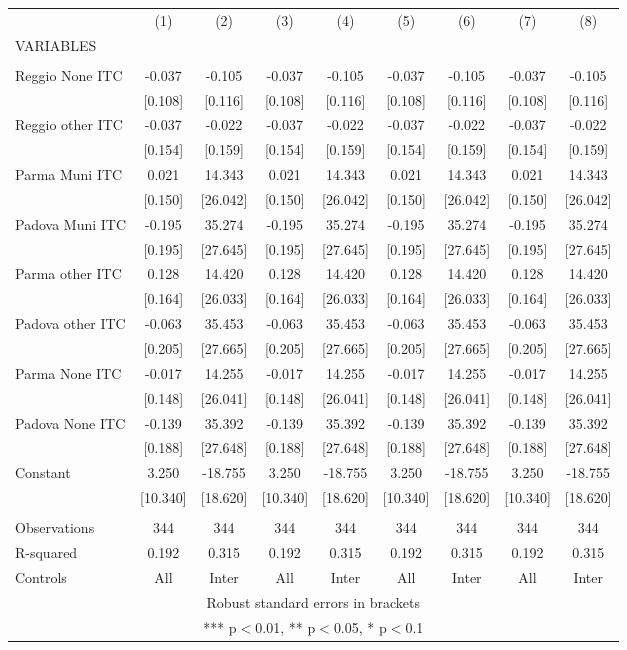 \begin{tabular}{lcccccccc} \hline
 & (1) & (2) & (3) & (4) & (5) & (6) & (7) & (8) \\
VARIABLES &  &  &  &  &  &  &  &  \\ \hline
 &  &  &  &  &  &  &  &  \\
Reggio None ITC & -0.037 & -0.105 & -0.037 & -0.105 & -0.037 & -0.105 & -0.037 & -0.105 \\
 & [0.108] & [0.116] & [0.108] & [0.116] & [0.108] & [0.116] & [0.108] & [0.116] \\
Reggio other ITC & -0.037 & -0.022 & -0.037 & -0.022 & -0.037 & -0.022 & -0.037 & -0.022 \\
 & [0.154] & [0.159] & [0.154] & [0.159] & [0.154] & [0.159] & [0.154] & [0.159] \\
Parma Muni ITC & 0.021 & 14.343 & 0.021 & 14.343 & 0.021 & 14.343 & 0.021 & 14.343 \\
 & [0.150] & [26.042] & [0.150] & [26.042] & [0.150] & [26.042] & [0.150] & [26.042] \\
Padova Muni ITC & -0.195 & 35.274 & -0.195 & 35.274 & -0.195 & 35.274 & -0.195 & 35.274 \\
 & [0.195] & [27.645] & [0.195] & [27.645] & [0.195] & [27.645] & [0.195] & [27.645] \\
Parma other ITC & 0.128 & 14.420 & 0.128 & 14.420 & 0.128 & 14.420 & 0.128 & 14.420 \\
 & [0.164] & [26.033] & [0.164] & [26.033] & [0.164] & [26.033] & [0.164] & [26.033] \\
Padova other ITC & -0.063 & 35.453 & -0.063 & 35.453 & -0.063 & 35.453 & -0.063 & 35.453 \\
 & [0.205] & [27.665] & [0.205] & [27.665] & [0.205] & [27.665] & [0.205] & [27.665] \\
Parma None ITC & -0.017 & 14.255 & -0.017 & 14.255 & -0.017 & 14.255 & -0.017 & 14.255 \\
 & [0.148] & [26.041] & [0.148] & [26.041] & [0.148] & [26.041] & [0.148] & [26.041] \\
Padova None ITC & -0.139 & 35.392 & -0.139 & 35.392 & -0.139 & 35.392 & -0.139 & 35.392 \\
 & [0.188] & [27.648] & [0.188] & [27.648] & [0.188] & [27.648] & [0.188] & [27.648] \\
Constant & 3.250 & -18.755 & 3.250 & -18.755 & 3.250 & -18.755 & 3.250 & -18.755 \\
 & [10.340] & [18.620] & [10.340] & [18.620] & [10.340] & [18.620] & [10.340] & [18.620] \\
 &  &  &  &  &  &  &  &  \\
Observations & 344 & 344 & 344 & 344 & 344 & 344 & 344 & 344 \\
R-squared & 0.192 & 0.315 & 0.192 & 0.315 & 0.192 & 0.315 & 0.192 & 0.315 \\
 Controls & All & Inter & All & Inter & All & Inter & All & Inter \\ \hline
\multicolumn{9}{c}{ Robust standard errors in brackets} \\
\multicolumn{9}{c}{ *** p$<$0.01, ** p$<$0.05, * p$<$0.1} \\
\end{tabular}
